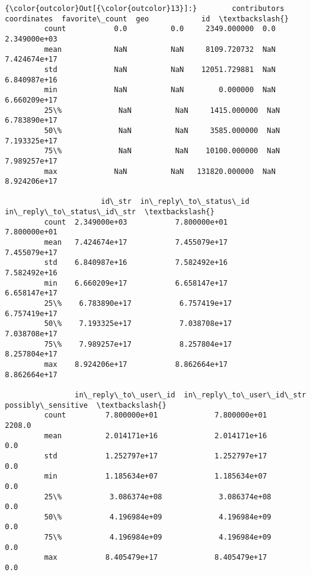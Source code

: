 \documentclass[11pt]{article}
\begin{document}
\begin{Verbatim}[commandchars=\\\{\}]
{\color{outcolor}Out[{\color{outcolor}13}]:}        contributors  coordinates  favorite\_count  geo            id  \textbackslash{}
         count           0.0          0.0     2349.000000  0.0  2.349000e+03   
         mean            NaN          NaN     8109.720732  NaN  7.424674e+17   
         std             NaN          NaN    12051.729881  NaN  6.840987e+16   
         min             NaN          NaN        0.000000  NaN  6.660209e+17   
         25\%             NaN          NaN     1415.000000  NaN  6.783890e+17   
         50\%             NaN          NaN     3585.000000  NaN  7.193325e+17   
         75\%             NaN          NaN    10100.000000  NaN  7.989257e+17   
         max             NaN          NaN   131820.000000  NaN  8.924206e+17   
         
                      id\_str  in\_reply\_to\_status\_id  in\_reply\_to\_status\_id\_str  \textbackslash{}
         count  2.349000e+03           7.800000e+01               7.800000e+01   
         mean   7.424674e+17           7.455079e+17               7.455079e+17   
         std    6.840987e+16           7.582492e+16               7.582492e+16   
         min    6.660209e+17           6.658147e+17               6.658147e+17   
         25\%    6.783890e+17           6.757419e+17               6.757419e+17   
         50\%    7.193325e+17           7.038708e+17               7.038708e+17   
         75\%    7.989257e+17           8.257804e+17               8.257804e+17   
         max    8.924206e+17           8.862664e+17               8.862664e+17   
         
                in\_reply\_to\_user\_id  in\_reply\_to\_user\_id\_str  possibly\_sensitive  \textbackslash{}
         count         7.800000e+01             7.800000e+01              2208.0   
         mean          2.014171e+16             2.014171e+16                 0.0   
         std           1.252797e+17             1.252797e+17                 0.0   
         min           1.185634e+07             1.185634e+07                 0.0   
         25\%           3.086374e+08             3.086374e+08                 0.0   
         50\%           4.196984e+09             4.196984e+09                 0.0   
         75\%           4.196984e+09             4.196984e+09                 0.0   
         max           8.405479e+17             8.405479e+17                 0.0   
         

\end{Verbatim}
\end{document}

